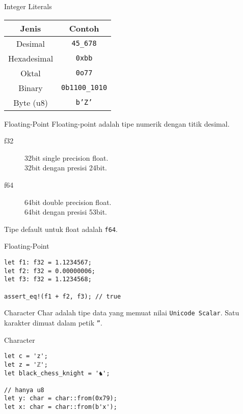 \documentclass[14pt]{beamer}
\newcommand{\hilite}[1] {%
\texttt{\alert{#1}}}
\begin{document}
\begin{frame}{Integer Literals}
\centering
\begin{tabular}{|c|c|}
    \hline
    \rowcolor{black!20}Jenis & Contoh\\
    \hline
    Desimal & \texttt{45\_678}\\
    Hexadesimal & \texttt{0xbb}\\ 
    Oktal & \texttt{0o77}\\
    Binary & \texttt{0b1100\_1010}\\
    Byte (u8) & \texttt{b'Z'}\\
    \hline
\end{tabular}
\end{frame}
\begin{frame}{Floating-Point}
Floating-point adalah tipe numerik dengan titik desimal.
\begin{description}
    \item [f32] 32bit single precision float.\\
    32bit dengan presisi 24bit.
    \item [f64] 64bit double precision float.\\
    64bit dengan presisi 53bit.
\end{description}

Tipe default untuk float adalah \hilite{f64}.
\end{frame}

\begin{frame}[fragile]{Floating-Point}

\begin{verbatim}
let f1: f32 = 1.1234567;
let f2: f32 = 0.00000006;
let f3: f32 = 1.1234568;

assert_eq!(f1 + f2, f3); // true
\end{verbatim}
\end{frame}

\begin{frame}[fragile]{Character}
Char adalah tipe data yang memuat nilai \hilite{Unicode Scalar}. Satu karakter dimuat dalam petik \hilite{''}.
\end{frame}

\begin{frame}[fragile]{Character}
\begin{verbatim}
let c = 'z';
let z = 'ℤ';
let black_chess_knight = '♞';

// hanya u8
let y: char = char::from(0x79);
let x: char = char::from(b'x');
\end{verbatim}
\end{frame}
\note{
}
\end{document}
